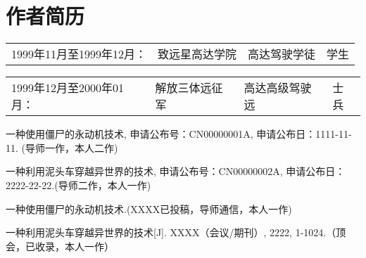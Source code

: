 \chapter{作者简历}


\begin{tabular}{llll}
    1999年11月至1999年12月： &  致远星高达学院  & 高达驾驶学徒  &  学生
\end{tabular}


\begin{tabular}{llll}
    1999年12月至2000年01月： &  解放三体远征军  & 高达高级驾驶远  &  士兵
\end{tabular}


    \begin{enumerate}[{[1]}]
        \item{一种使用僵尸的永动机技术, 申请公布号：CN00000001A, 申请公布日：1111-11-11. (导师一作，本人二作)}
        \item{一种利用泥头车穿越异世界的技术, 申请公布号：CN00000002A, 申请公布日：2222-22-22.(导师二作，本人一作)}
    \end{enumerate}


    \begin{enumerate}[{[1]}]
        \item{一种使用僵尸的永动机技术.(XXXX已投稿，导师通信，本人一作)}
        \item{一种利用泥头车穿越异世界的技术[J]. XXXX（会议/期刊）, 2222, 1-1024.（顶会，已收录，本人一作）}
    \end{enumerate}